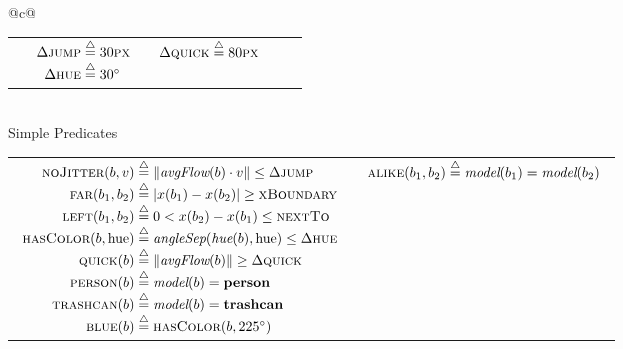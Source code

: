 \begin{table}
{\begin{tabular}{@{}c@{}}
\begin{tabular}{@{}c@{\hspace*{2ex}}c@{\hspace*{2ex}}c@{\hspace*{2ex}}c@{\hspace*{2ex}}c@{}}
\begin{math}
        \end{math}&
        \begin{math}
          \begin{array}[t]{r@{\;\define\;}l}
            \Delta\textsc{jump} & 30\textsc{px}\\
            \Delta\textsc{hue} & 30\degr
          \end{array}
        \end{math}&
        \begin{math}
          \begin{array}[t]{r@{\;\define\;}l}
            \Delta\textsc{quick} & 80\textsc{px}
          \end{array}
        \end{math}
      \end{tabular}\\
      \midrule Simple Predicates\\ \midrule \addlinespace[1ex]
      \begin{tabular}{@{}c@{\hspace{5ex}}c@{}}
        \begin{math}
          \begin{array}[t]{r@{\;\define\;}l}
            \textsc{noJitter}(b,v) &
            \lVert\textit{avgFlow}(b)\cdot v\rVert\le\Delta\textsc{jump}\\
            \textsc{far}(b_1,b_2) &
            \lvert x(b_1)-x(b_2)\rvert\ge\textsc{xBoundary}\\
            \textsc{left}(b_1,b_2) &
            0<x(b_2)-x(b_1)\le\textsc{nextTo}\\
            \textsc{hasColor}(b,\textrm{hue}) &
            \textit{angleSep}(\textit{hue}(b),\textrm{hue})\le
            \Delta\textsc{hue}\\
            \textsc{quick}(b) &
            \lVert\textit{avgFlow}(b)\rVert\ge\Delta\textsc{quick}\\
            \textsc{person}(b) & \textit{model}(b)=\textbf{person}\\
            \textsc{trashcan}(b) & \textit{model}(b)=\textbf{trashcan}\\
            \textsc{blue}(b) & \textsc{hasColor}(b,225^\circ)
          \end{array}
        \end{math}&
        \begin{math}
          \begin{array}[t]{r@{\;\define\;}l}
            \textsc{alike}(b_1,b_2) &
            \textit{model}(b_1)=\textit{model}(b_2)\\

\end{array}
\end{math}
\end{tabular}
\end{tabular}}
\end{table}
